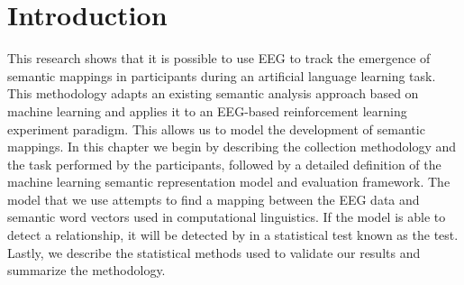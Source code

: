 \section{Introduction}

This research shows that it is possible to use EEG to track the emergence of semantic mappings in participants during an artificial language learning task. This methodology adapts an existing semantic analysis approach based on machine learning and applies it to an EEG-based reinforcement learning experiment paradigm. This allows us to model the development of semantic mappings. In this chapter we begin by describing the collection methodology and the task performed by the participants, followed by a detailed definition of the machine learning semantic representation model and evaluation framework. The model that we use attempts to find a mapping between the EEG data and semantic word vectors used in computational linguistics. If the model is able to detect a relationship, it will be detected by in a statistical test known as the \tvt test. Lastly, we describe the statistical methods used to validate our results and summarize the methodology.
